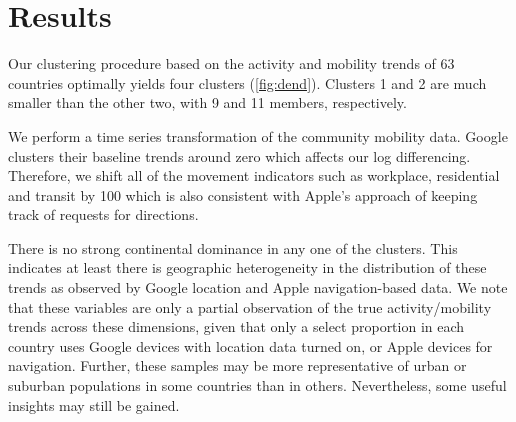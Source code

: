 \documentclass[preprint, 12pt]{elsarticle}
\newcommand{\?}{\stackrel{?}{=}}
\begin{document}





\section{Results }
Our clustering procedure based on the activity and mobility trends of 63 countries optimally yields four clusters (\autoref{fig:dend}).
Clusters 1 and 2 are much smaller than the other two, with 9 and 11 members, respectively.

We perform a time series transformation of the community mobility data. Google clusters their baseline trends around zero which affects our log differencing.
Therefore, we shift all of the movement indicators such as workplace, residential and transit by 100 which is also consistent with Apple's approach of keeping track of requests for directions.

There is no strong continental dominance in any one of the clusters.
This indicates at least there is geographic heterogeneity in the distribution of these trends as observed by Google location and Apple navigation-based data.
We note that these variables are only a partial observation of the true activity/mobility trends across these dimensions, given that only a select proportion in each country uses Google devices with location data turned on, or Apple devices for navigation.
Further, these samples may be more representative of urban or suburban populations in some countries than in others.
Nevertheless, some useful insights may still be gained.
\end{document}

